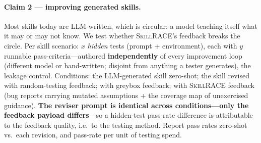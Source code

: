 \documentclass[11pt]{article}
\newcommand{\tool}{\textsc{SkillRACE}\xspace}
\begin{document}
\paragraph{Claim 2 --- improving generated skills.} Most skills today are
LLM-written, which is circular: a model teaching itself what it may or may not
know. We test whether \tool's feedback breaks the circle. Per skill scenario:
$x$ \emph{hidden} tests (prompt + environment), each with $y$ runnable
pass-criteria---authored \textbf{independently} of every improvement loop
(different model or hand-written; disjoint from anything a tester generates), the
leakage control. Conditions: the LLM-generated skill zero-shot; the skill
revised with random-testing feedback; with greybox feedback; with \tool
feedback (bug reports carrying mutated assumptions + the coverage map of
unexercised guidance). \textbf{The reviser prompt is identical across
conditions---only the feedback payload differs}---so a hidden-test pass-rate
difference is attributable to the feedback quality, i.e.\ to the testing
method. Report pass rates zero-shot vs.\ each revision, and pass-rate per unit
of testing spend.
\end{document}
